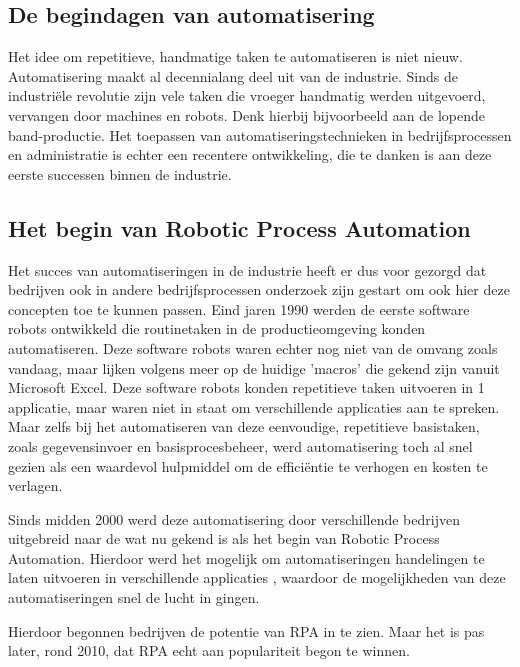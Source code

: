 \subsection{De begindagen van automatisering}
\label{subsec:begindagen-van-automatisering}

Het idee om repetitieve, handmatige taken te automatiseren is niet nieuw.
Automatisering maakt al decennialang deel uit van de industrie. Sinds de industriële revolutie zijn vele taken die vroeger handmatig werden uitgevoerd, vervangen door machines en robots. Denk hierbij bijvoorbeeld aan de lopende band-productie. Het toepassen van automatiseringstechnieken in bedrijfsprocessen en administratie is echter een recentere ontwikkeling, die te danken is aan deze eerste successen binnen de industrie.

\subsection{Het begin van Robotic Process Automation}
\label{subsec:begin-van-rpa}

Het succes van automatiseringen in de industrie heeft er dus voor gezorgd dat bedrijven ook in andere bedrijfsprocessen onderzoek zijn gestart om ook hier deze concepten toe te kunnen passen. Eind jaren 1990 werden de eerste software robots ontwikkeld die routinetaken in de productieomgeving konden automatiseren. Deze software robots waren echter nog niet van de omvang zoals vandaag, maar lijken volgens \textcite{ZalewskaTurzynska2022} meer op de huidige 'macros' die gekend zijn vanuit Microsoft Excel. 
Deze software robots konden repetitieve taken uitvoeren in 1 applicatie, maar waren niet in staat om verschillende applicaties aan te spreken. Maar zelfs bij het automatiseren van deze eenvoudige, repetitieve basistaken, zoals gegevensinvoer en basisprocesbeheer, werd automatisering toch al snel gezien als een waardevol hulpmiddel om de efficiëntie te verhogen en kosten te verlagen.

Sinds midden 2000 werd deze automatisering door verschillende bedrijven uitgebreid naar de wat nu gekend is als het begin van Robotic Process Automation. Hierdoor werd het mogelijk om automatiseringen handelingen te laten uitvoeren in verschillende applicaties \autocite{Fluss2020}, waardoor de mogelijkheden van deze automatiseringen snel de lucht in gingen.

Hierdoor begonnen bedrijven de potentie van RPA in te zien. Maar het is pas later, rond 2010, dat RPA echt aan populariteit begon te winnen.

